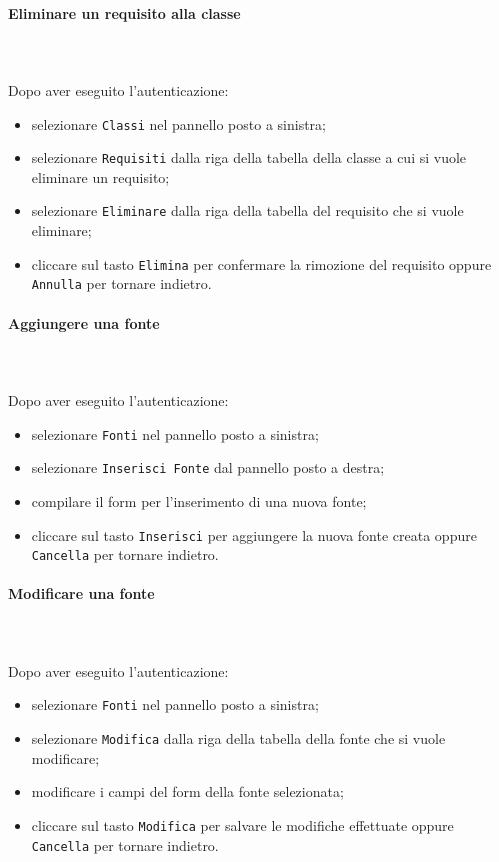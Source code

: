 \paragraph{Eliminare un requisito alla classe} \mbox{}\\ \mbox{}\\
Dopo aver eseguito l'autenticazione:
\begin{itemize}
	\item selezionare \texttt{Classi} nel pannello posto a sinistra;
	\item selezionare \texttt{Requisiti} dalla riga della tabella della classe
		a cui si vuole eliminare un requisito;\
	\item selezionare \texttt{Eliminare} dalla riga della tabella del requisito
		che si vuole eliminare;
	\item cliccare sul tasto \texttt{Elimina} per confermare la rimozione del requisito
		oppure \texttt{Annulla} per tornare indietro.
\end{itemize}

\paragraph{Aggiungere una fonte} \mbox{}\\ \mbox{}\\
Dopo aver eseguito l'autenticazione:
\begin{itemize}
	\item selezionare \texttt{Fonti} nel pannello posto a sinistra;
	\item selezionare \texttt{Inserisci Fonte} dal pannello posto a destra;
	\item compilare il form per l'inserimento di una nuova fonte;
	\item cliccare sul tasto \texttt{Inserisci} per aggiungere la nuova fonte 
		creata oppure \texttt{Cancella} per tornare indietro.	
\end{itemize}

\paragraph{Modificare una fonte} \mbox{}\\ \mbox{}\\
Dopo aver eseguito l'autenticazione:
\begin{itemize}
	\item selezionare \texttt{Fonti} nel pannello posto a sinistra;
	\item selezionare \texttt{Modifica} dalla riga della tabella della fonte
		che si vuole modificare;
	\item modificare i campi del form della fonte selezionata;
	\item cliccare sul tasto \texttt{Modifica} per salvare le modifiche effettuate
		oppure \texttt{Cancella} per tornare indietro.
\end{itemize}

